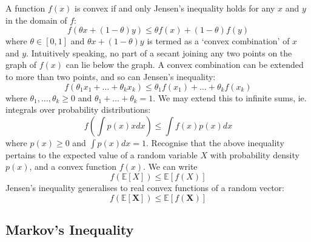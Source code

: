 \documentclass[11pt]{report} %
\begin{document}
A function $f\left(x\right)$ is convex if and only Jensen's inequality holds for any $x$ and $y$ in the domain of $f$:
\begin{equation}
f\left(\theta x + \left(1 - \theta\right)y\right) \leq \theta f\left(x\right) + \left(1 - \theta\right)f\left(y\right)
\end{equation}
where $\theta \in \left[0, 1\right]$ and $\theta x + \left(1 - \theta\right)y$ is termed as a `convex combination' of $x$ and $y$. Intuitively speaking, no part of a secant joining any two points on the graph of $f\left(x\right)$ can lie below the graph. A convex combination can be extended to more than two points, and so can Jensen's inequality:
\begin{equation}
f\left(\theta_{1}x_{1} + \dots + \theta_{k}x_{k}\right) \leq \theta_{1}f\left(x_{1}\right) + \dots + \theta_{k}f\left(x_{k}\right)
\end{equation}
where $\theta_{1}, \dots, \theta_{k} \geq 0$ and $\theta_{1} + \dots + \theta_{k} = 1$. We may extend this to infinite sums, ie. integrals over probability distributions:
\begin{equation}
f\left(\int p\left(x\right) x dx\right) \leq \int f\left(x\right)p\left(x\right) dx
\end{equation}
where $p\left(x\right) \geq 0$ and $\int p\left(x\right) dx = 1$. Recognise that the above inequality pertains to the expected value of a random variable $X$ with probability density $p\left(x\right)$, and a convex function $f\left(x\right)$. We can write
\begin{equation}
f\left(\mathbb{E}\left[X\right]\right) \leq \mathbb{E}\left[f\left(X\right)\right]
\end{equation}
Jensen's inequality generalises to real convex functions of a random vector:
\begin{equation}
f\left(\mathbb{E}\left[\mathbf{X}\right]\right) \leq \mathbb{E}\left[f\left(\mathbf{X}\right)\right]
\end{equation}

\subsection{Markov's Inequality}
\end{document}
